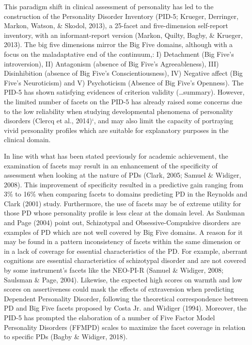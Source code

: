 \documentclass[floatsintext,man]{apa6}
\theoremstyle{definition}
\theoremstyle{definition}
\theoremstyle{definition}
\theoremstyle{remark}
\begin{document}
This paradigm shift in clinical assessment of personality has led to the
construction of the Personality Disorder Inventory (PID-5; Krueger,
Derringer, Markon, Watson, \& Skodol, 2013), a 25-facet and
five-dimension self-report inventory, with an informant-report version
(Markon, Quilty, Bagby, \& Krueger, 2013). The big five dimensions
mirror the Big Five domains, although with a focus on the maladaptative
end of the continuum,: I) Detachment (Big Five's introversion), II)
Antagonism (absence of Big Five's Agreeableness), III) Disinhibition
(absence of Big Five's Conscientiousness), IV) Negative affect (Big
Five's Neuroticism) and V) Psychoticism (Absence of Big Five's
Openness). The PID-5 has shown satisfying evidences of criterion
validity (\ldots{}summary). However, the limited number of facets on the
PID-5 has already raised some concerns due to the low reliability when
studying developmental phenomena of personality disorders (Clercq et
al., 2014)`, and may also limit the capacity of portraying vivid
personality profiles which are suitable for explanatory purposes in the
clinical domain.

In line with what has been stated previously for academic achievement,
the examination of facets may result in an enhancement of the
specificity of assessment when looking at the nature of PDs (Clark,
2005; Samuel \& Widiger, 2008). This improvement of specificity resulted
in a predictive gain ranging from 3\% to 16\% when comparing facets to
domains predicting PD in the Reynolds and Clark (2001) study.
Furthermore, the use of facets may be of extreme utility for those PD
whose personality profile is less clear at the domain level. As Saulsman
and Page (2004) point out, Schizotypal and Obsessive-Compulsive
disorders are examples of PD which are not well covered by Big Five
domains. A reason for it may be found in a pattern inconsistency of
facets within the same dimension or in a lack of coverage for essential
characteristics of the PD. For example, aberrant cognitions are
essential characteristics of schizotypal disorder and are not covered by
some instrument's facets like the NEO-PI-R (Samuel \& Widiger, 2008;
Saulsman \& Page, 2004). Likewise, the expected high scores on warmth
and low scores on assertiveness could mask the effects of extraversion
when predicting Dependent Personality Disorder, following the
theoretical correspondence between PD and Big Five facets proposed by
Costa Jr. and Widiger (1994). Moreover, the PID-5 has prompted the
elaboration of a number of Five Factor Model Personality Disorders
(FFMPD) scales to maximize the facet coverage in relation to specific
PDs (Bagby \& Widiger, 2018).
\end{document}
